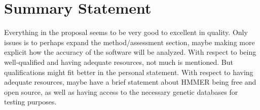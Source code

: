\documentclass{article}
\begin{document}
\section*{Summary Statement}
Everything in the proposal seems to be very good to excellent in quality.  Only issues is to perhaps expand the method/assessment section, maybe making more explicit how the accuracy of the software will be analyzed.  With respect to being well-qualified and having adequate resources, not much is mentioned.  But qualifications might fit better in the personal statement.  With respect to having adequate resources, maybe have a brief statement about HMMER being free and open source, as well as having access to the necessary genetic databases for testing purposes.
\end{document}
